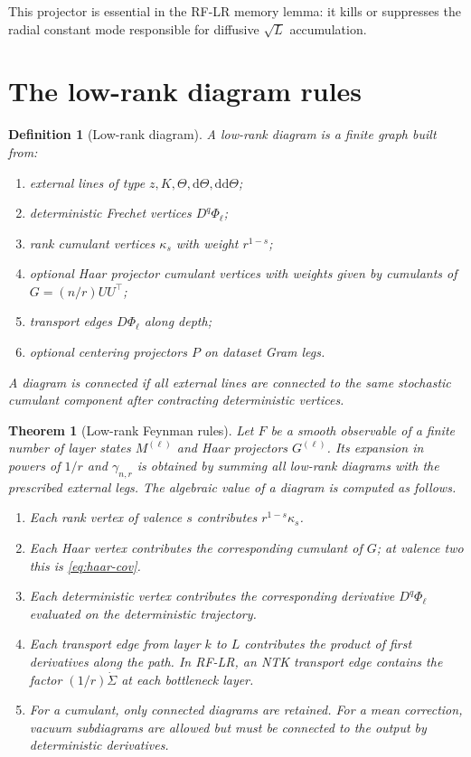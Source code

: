\documentclass[11pt]{article}
\newtheorem{theorem}{Theorem}
\newtheorem{definition}{Definition}
\begin{document}
This projector is essential in the RF-LR memory lemma: it kills or suppresses the radial constant mode responsible for diffusive $\sqrt L$ accumulation.

\section{The low-rank diagram rules}

\begin{definition}[Low-rank diagram]
A low-rank diagram is a finite graph built from:
\begin{enumerate}
\item external lines of type $z,K,\Theta,\mathrm d\Theta,\mathrm{dd}\Theta$;
\item deterministic Frechet vertices $D^q\Phi_\ell$;
\item rank cumulant vertices $\kappa_s$ with weight $r^{1-s}$;
\item optional Haar projector cumulant vertices with weights given by cumulants of $G=(n/r)UU^\top$;
\item transport edges $D\Phi_\ell$ along depth;
\item optional centering projectors $P$ on dataset Gram legs.
\end{enumerate}
A diagram is connected if all external lines are connected to the same stochastic cumulant component after contracting deterministic vertices.
\end{definition}

\begin{theorem}[Low-rank Feynman rules]
Let $F$ be a smooth observable of a finite number of layer states $M^{(\ell)}$ and Haar projectors $G^{(\ell)}$.  Its expansion in powers of $1/r$ and $\gamma_{n,r}$ is obtained by summing all low-rank diagrams with the prescribed external legs.  The algebraic value of a diagram is computed as follows.
\begin{enumerate}
\item Each rank vertex of valence $s$ contributes $r^{1-s}\kappa_s$.
\item Each Haar vertex contributes the corresponding cumulant of $G$; at valence two this is \eqref{eq:haar-cov}.
\item Each deterministic vertex contributes the corresponding derivative $D^q\Phi_\ell$ evaluated on the deterministic trajectory.
\item Each transport edge from layer $k$ to $L$ contributes the product of first derivatives along the path.  In RF-LR, an NTK transport edge contains the factor $(1/r)\dot\Sigma$ at each bottleneck layer.
\item For a cumulant, only connected diagrams are retained.  For a mean correction, vacuum subdiagrams are allowed but must be connected to the output by deterministic derivatives.
\end{enumerate}
\end{theorem}
\end{document}
